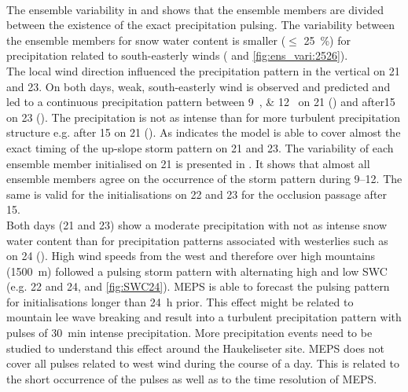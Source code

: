 \\
The ensemble variability in  and  shows that the ensemble members are divided between the existence of the exact precipitation pulsing. 
The variability between the ensemble members for snow water content is smaller ($\le$ \SI{25}{\percent}) for precipitation related to south-easterly winds ( and \ref{fig:ens_vari:2526}). 
\\
The local wind direction influenced the precipitation pattern in the vertical on \num{21} and \SI{23}{\dec}. On both days, weak, south-easterly wind is observed and predicted and led to a continuous precipitation pattern between \SIlist{9;12}{\UTC} on \num{21} () and after\SI{15}{\UTC} on \SI{23}{\dec} (). The precipitation is not as intense than for more turbulent precipitation structure e.g. after \SI{15}{\UTC} on \SI{21}{\dec} ().
As  indicates the model is able to cover almost the exact timing of the up-slope storm pattern on \num{21} and \SI{23}{\dec}. The variability of each ensemble member initialised on \SI{21}{\dec} is presented in . It shows that almost all ensemble members agree on the occurrence of the storm pattern during \SIrange{9}{12}{\UTC}. The same is valid for the initialisations on \num{22} and \SI{23}{\dec} for the occlusion passage after \SI{15}{\UTC}.
\\
Both days (\num{21} and \SI{23}{\dec}) show a moderate precipitation with not as intense snow water content than for precipitation patterns associated with westerlies such as on \SI{24}{\dec} (). 
High wind speeds from the west and therefore over high mountains (\SI{1500}{\metre}) followed a pulsing storm pattern with alternating high and low SWC (e.g. \num{22} and \SI{24}{\dec},  and \ref{fig:SWC24}). MEPS is able to forecast the pulsing pattern for initialisations longer than \SI{24}{\hour} prior.
This effect might be related to mountain lee wave breaking %
and result into a turbulent precipitation pattern with pulses of \SI{30}{\minute} intense precipitation. More precipitation events need to be studied to understand this effect around the Haukeliseter site. MEPS does not cover all pulses related to west wind during the course of a day. This is related to the short occurrence of the pulses as well as to the time resolution of MEPS. %
